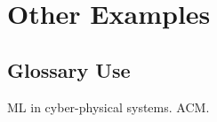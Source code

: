 



\section{Other Examples}

\subsection{Glossary Use}

\Gls{ML} in \glspl{cyber-physical system}.
\gls{ACM}.
